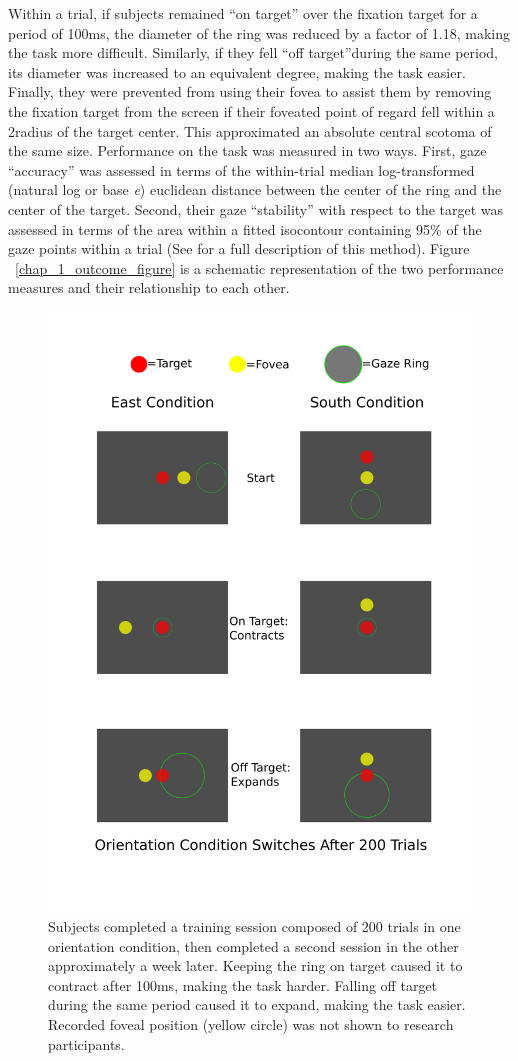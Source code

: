 Within a trial, if subjects remained ``on target'' over the fixation target for a period of 100ms, the diameter of the ring was reduced by a factor of 1.18, making the task more difficult. Similarly, if they fell ``off target''during the same period, its diameter was increased to an equivalent degree, making the task easier. Finally, they were prevented from using their fovea to assist them by removing the fixation target from the screen if their foveated point of regard fell within a 2\degree radius of the target center. This approximated an absolute central scotoma of the same size. Performance on the task was measured in two ways. First, gaze ``accuracy'' was assessed in terms of the within-trial median log-transformed (natural log or base \textit{e}) euclidean distance between the center of the ring and the center of the target. Second, their gaze ``stability'' with respect to the target was assessed in terms of the area within a fitted isocontour containing 95\% of the gaze points within a trial (See \cite{castet_2012} for a full description of this method). Figure ~\ref{chap_1_outcome_figure} is a schematic representation of the two performance measures and their relationship to each other.

\begin{figure}[!htbp]
\centering
\includegraphics[width=.75\linewidth,height=.75\textheight,keepaspectratio]{figures/chapter_1/demo_image.png}
\caption[Schematic Depiction of Experimental Design for Experiment 1]{Subjects completed a training session composed of 200 trials in one orientation condition, then completed a second session in the other approximately a week later. Keeping the ring on target caused it to contract after 100ms, making the task harder. Falling off target during the same period caused it to expand, making the task easier. Recorded foveal position (yellow circle) was not shown to research participants.}\label{chap_1_demo_figure}
\end{figure}
 
